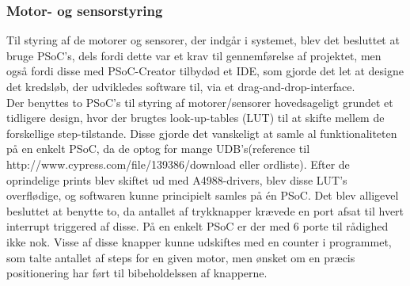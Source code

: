 \subsubsection{Motor- og sensorstyring}
Til styring af de motorer og sensorer, der indgår i systemet, blev det besluttet at bruge PSoC's, dels fordi dette var et krav til gennemførelse af projektet, men også fordi disse med PSoC-Creator tilbydød et IDE, som gjorde det let at designe det kredsløb, der udvikledes software til, via et drag-and-drop-interface. \\

Der benyttes to PSoC's til styring af motorer/sensorer hovedsageligt grundet et tidligere design, hvor der brugtes look-up-tables (LUT) til at skifte mellem de forskellige step-tilstande. Disse gjorde det vanskeligt at samle al funktionaliteten på en enkelt PSoC, da de optog for mange UDB's(reference til http://www.cypress.com/file/139386/download eller ordliste). Efter de oprindelige prints blev skiftet ud med A4988-drivers, blev disse LUT's overflødige, og softwaren kunne principielt samles på én PSoC. Det blev alligevel besluttet at benytte to, da antallet af trykknapper krævede en port afsat til hvert interrupt triggered af disse. På en enkelt PSoC er der med 6 porte til rådighed ikke nok. Visse af disse knapper kunne udskiftes med en counter i programmet, som talte antallet af steps for en given motor, men ønsket om en præcis positionering har ført til bibeholdelssen af knapperne.